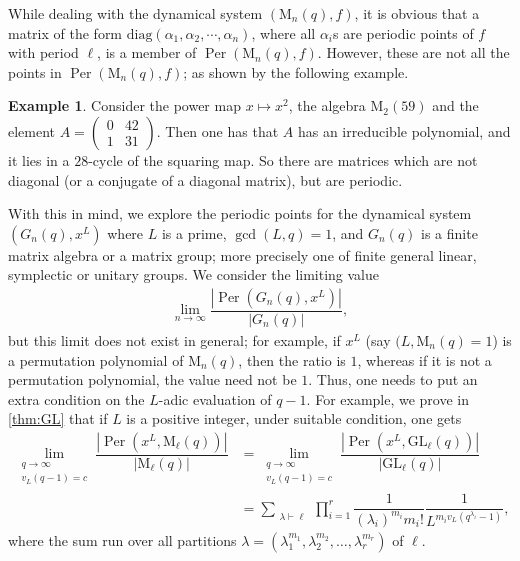 \documentclass[11pt,twoside]{amsart}
\newcommand{\GL}{\mathrm{GL}}
\newcommand{\M}{\mathrm{M}}
\newcommand{\diag}{\mathrm{diag}}
\newcommand{\per}{\operatorname{Per}}
\theoremstyle{definition} %
\newtheorem{example}[lemma]{Example}
\begin{document}
While dealing with the dynamical system $(\M_n(q),f)$, it is obvious that a matrix of the form $\diag(\alpha_1,\alpha_2,\cdots,\alpha_n)$, where all $\alpha_i$s are periodic points of $f$ with period $\ell$, is a member of $\per(\M_n(q),f)$. 
However, these are not all the points in $\per(\M_n(q),f)$; as shown by the following example.
\begin{example}
Consider the power map $x\mapsto x^2$, the algebra $\M_2(59)$ and the element 
$A=\begin{pmatrix}
    0 & 42\\1 & 31
\end{pmatrix}$.
Then one has that $A$ has an irreducible polynomial, and it lies in a $28$-cycle of the squaring map. 
So there are matrices which are not diagonal (or a conjugate of a diagonal matrix), but are periodic.    
\end{example}
With this in mind, we explore the periodic points for the dynamical system $(G_n(q),x^L)$ where $L$ is a prime, $\gcd(L,q)=1$, and $G_n(q)$ is a finite matrix algebra or a matrix group; more precisely one of finite general linear, symplectic or unitary groups.
We consider the limiting value
\begin{align*}
    \lim\limits_{n\longrightarrow\infty} \dfrac{|\per(G_n(q),x^L)|}{|G_n(q)|},
\end{align*}
but this limit does not exist in general; for example, if $x^L$ (say $(L,\M_n(q)=1$) is a permutation polynomial of $\M_n(q)$, then the ratio is $1$, whereas if it is not a permutation polynomial, the value need not be $1$.
Thus, one needs to put an extra condition on the $L$-adic evaluation of $q-1$. 
For example, we prove in \cref{thm:GL} that if $L$ is a positive integer, under suitable condition, one gets     \begin{align*}
        \lim\limits_{\substack{q\longrightarrow \infty\\v_L(q-1)=c}}\dfrac{\left|\per(x^L,\M_\ell(q))\right|}{|\M_\ell(q)|}
    &=    \lim\limits_{\substack{q\longrightarrow \infty\\
    v_L(q-1)=c}}\dfrac{\left|\per(x^L,\GL_\ell(q))\right|}{|\GL_\ell(q)|}\\
    &=\sum\limits_{\substack{\lambda\vdash \ell}}\prod\limits_{i=1}^{r}\dfrac{1}{(\lambda_i)^{m_i}m_i!}\dfrac{1}{L^{m_iv_L(q^{\lambda_i}-1)}},
    \end{align*}
    where the sum run over all partitions $\lambda=(\lambda_1^{m_1},\lambda_2^{m_2},\ldots,\lambda_r^{m_r})$ of $\ell$.
    
\end{document}
